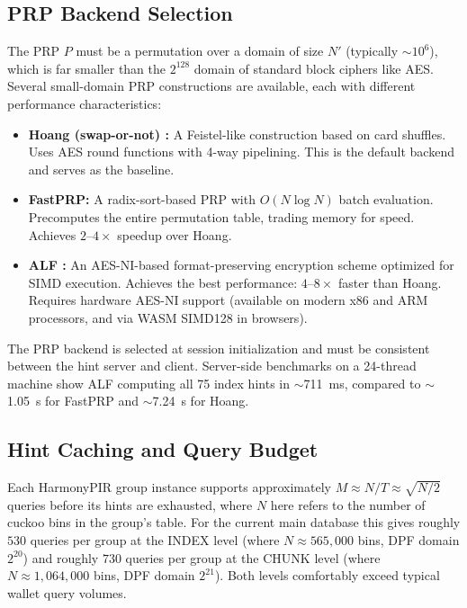 \subsection{PRP Backend Selection}
\label{sec:prp-backends}

The PRP $P$ must be a permutation over a domain of size $N'$ (typically $\sim 10^6$), which is far smaller than the $2^{128}$ domain of standard block ciphers like AES. Several small-domain PRP constructions are available, each with different performance characteristics:

\begin{itemize}[nolistsep,leftmargin=*]
    \item \textbf{Hoang (swap-or-not) \cite{hoang12}:} A Feistel-like construction based on card shuffles. Uses AES round functions with 4-way pipelining. This is the default backend and serves as the baseline.

    \item \textbf{FastPRP:} A radix-sort-based PRP with $O(N \log N)$ batch evaluation. Precomputes the entire permutation table, trading memory for speed. Achieves $2$--$4\times$ speedup over Hoang.

    \item \textbf{ALF \cite{alf25}:} An AES-NI-based format-preserving encryption scheme optimized for SIMD execution. Achieves the best performance: $4$--$8\times$ faster than Hoang. Requires hardware AES-NI support (available on modern x86 and ARM processors, and via WASM SIMD128 in browsers).
\end{itemize}

The PRP backend is selected at session initialization and must be consistent between the hint server and client. Server-side benchmarks on a 24-thread machine show ALF computing all 75 index hints in $\sim$711~ms, compared to $\sim$1.05~s for FastPRP and $\sim$7.24~s for Hoang.

\subsection{Hint Caching and Query Budget}
\label{sec:harmony-caching}

Each HarmonyPIR group instance supports approximately $M \approx N/T \approx \sqrt{N/2}$ queries before its hints are exhausted, where $N$ here refers to the number of cuckoo bins in the group's table. For the current main database this gives roughly $530$ queries per group at the INDEX level (where $N \approx 565{,}000$ bins, DPF domain $2^{20}$) and roughly $730$ queries per group at the CHUNK level (where $N \approx 1{,}064{,}000$ bins, DPF domain $2^{21}$). Both levels comfortably exceed typical wallet query volumes.

